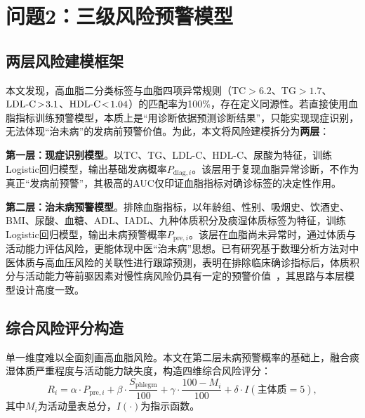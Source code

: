 \documentclass[a4paper,12pt]{ctexart}
\begin{document}
\section{问题2：三级风险预警模型}

\subsection{两层风险建模框架}

本文发现，高血脂二分类标签与血脂四项异常规则（$\text{TC}\!>\!6.2$、$\text{TG}\!>\!1.7$、$\text{LDL\text{-}C}\!>\!3.1$、$\text{HDL\text{-}C}\!<\!1.04$）的匹配率为100\%，存在定义同源性。若直接使用血脂指标训练预警模型，本质上是``用诊断依据预测诊断结果''，只能实现现症识别，无法体现``治未病''的发病前预警价值。为此，本文将风险建模拆分为\textbf{两层}：

\textbf{第一层：现症识别模型}。以TC、TG、LDL-C、HDL-C、尿酸为特征，训练Logistic回归模型，输出基础发病概率$P_{\text{diag},i}$。该层用于复现血脂异常诊断，不作为真正``发病前预警''，其极高的AUC仅印证血脂指标对确诊标签的决定性作用。

\textbf{第二层：治未病预警模型}。排除血脂指标，以年龄组、性别、吸烟史、饮酒史、BMI、尿酸、血糖、ADL、IADL、九种体质积分及痰湿体质标签为特征，训练Logistic回归模型，输出未病预警概率$P_{\text{pre},i}$。该层在血脂尚未异常时，通过体质与活动能力评估风险，更能体现中医``治未病''思想。已有研究基于数理分析方法对中医体质与高血压风险的关联性进行跟踪预测，表明在排除临床确诊指标后，体质积分与活动能力等前驱因素对慢性病风险仍具有一定的预警价值~\cite{zhou2021hypertension}，其思路与本层模型设计高度一致。

\subsection{综合风险评分构造}

单一维度难以全面刻画高血脂风险。本文在第二层未病预警概率的基础上，融合痰湿体质严重程度与活动能力缺失度，构造四维综合风险评分：
\begin{equation}
R_i = \alpha\cdot P_{\text{pre},i} + \beta\cdot\frac{S_{\text{phlegm}}}{100} + \gamma\cdot\frac{100-M_i}{100} + \delta\cdot I(\text{主体质}=5),
\end{equation}
其中$M_i$为活动量表总分，$I(\cdot)$为指示函数。
\end{document}
